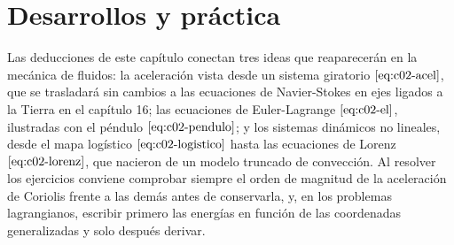 \documentclass[10pt,openany]{book}
\begin{document}
\section{Desarrollos y práctica}

Las deducciones de este capítulo conectan tres ideas que reaparecerán en la mecánica de fluidos: la aceleración vista desde un sistema giratorio \(\eqref{eq:c02-acel}\), que se trasladará sin cambios a las ecuaciones de Navier-Stokes en ejes ligados a la Tierra en el capítulo 16; las ecuaciones de Euler-Lagrange \(\eqref{eq:c02-el}\), ilustradas con el péndulo \(\eqref{eq:c02-pendulo}\); y los sistemas dinámicos no lineales, desde el mapa logístico \(\eqref{eq:c02-logistico}\) hasta las ecuaciones de Lorenz \(\eqref{eq:c02-lorenz}\), que nacieron de un modelo truncado de convección. Al resolver los ejercicios conviene comprobar siempre el orden de magnitud de la aceleración de Coriolis frente a las demás antes de conservarla, y, en los problemas lagrangianos, escribir primero las energías en función de las coordenadas generalizadas y solo después derivar.
\end{document}
